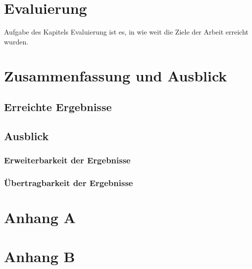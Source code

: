\documentclass[oneside]{ausarbeitung}
\begin{document}
\chapter{Evaluierung}

Aufgabe des Kapitels Evaluierung ist es, in wie weit die Ziele der Arbeit erreicht wurden.

\chapter{Zusammenfassung und Ausblick}
\label{cha:zusammenfassung}

\section{Erreichte Ergebnisse}
\label{sec:ergebnisse}

\section{Ausblick}
\label{sec:ausblick}

\subsection{Erweiterbarkeit der Ergebnisse}
\label{sub:erweiterbarkeit}

\subsection{Übertragbarkeit der Ergebnisse}
\label{sub:uebertragbarkeit}

\appendix

\printbibliography

\chapter{Anhang A}

\chapter{Anhang B}
\end{document}
